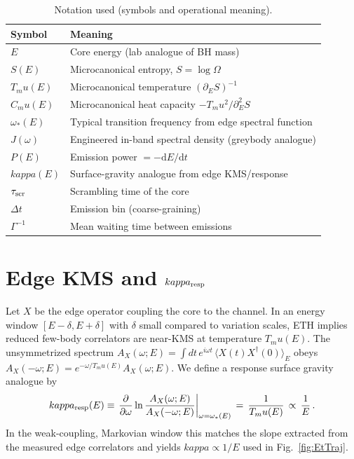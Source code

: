 \documentclass[aps,prx,onecolumn,showpacs,superscriptaddress,longbibliography,nofootinbib]{revtex4-2}
\def\kappa{kappa}%
\def\mu{mu}%
\begin{document}
\begin{table}[t]
\centering
\caption{Notation used (symbols and operational meaning).}
\label{tab:notation}
\begin{tabular}{ll}
\toprule
Symbol & Meaning \\
\midrule
$E$ & Core energy (lab analogue of BH mass) \\
$S(E)$ & Microcanonical entropy, $S=\log\Omega$ \\
$T_\mu(E)$ & Microcanonical temperature $(\partial_E S)^{-1}$ \\
$C_\mu(E)$ & Microcanonical heat capacity $-T_\mu^2/\partial_E^2 S$ \\
$\omega_\ast(E)$ & Typical transition frequency from edge spectral function \\
$J(\omega)$ & Engineered in-band spectral density (greybody analogue) \\
$P(E)$ & Emission power $= -\mathrm{d}E/\mathrm{d}t$ \\
$\kappa(E)$ & Surface-gravity analogue from edge KMS/response \\
$\tau_{\rm scr}$ & Scrambling time of the core \\
$\Delta t$ & Emission bin (coarse-graining) \\
$\Gamma^{-1}$ & Mean waiting time between emissions \\
\bottomrule
\end{tabular}
\end{table}

\appendix

\section{Edge KMS and \texorpdfstring{$\kappa_{\rm resp}$}{kapparesp}}
Let $X$ be the edge operator coupling the core to the channel. In an energy window $[E-\delta,E+\delta]$ with $\delta$ small compared to variation scales, ETH implies reduced few-body correlators are near-KMS at temperature $T_\mu(E)$. The unsymmetrized spectrum $A_X(\omega;E)=\int dt\, e^{i\omega t}\,\langle X(t)X^\dagger(0)\rangle_E$ obeys $A_X(-\omega;E)=e^{-\omega/T_\mu(E)}A_X(\omega;E)$. We define a response surface gravity analogue by
\begin{equation}
 \kappa_{\rm resp}(E) \equiv \left.\frac{\partial}{\partial \omega}\ln\frac{A_X(\omega;E)}{A_X(-\omega;E)}\right|_{\omega=\omega_\ast(E)}\,=\,\frac{1}{T_\mu(E)}\,\propto\,\frac{1}{E}\,.
\end{equation}
In the weak-coupling, Markovian window this matches the slope extracted from the measured edge correlators and yields $\kappa\propto 1/E$ used in Fig.~\ref{fig:EtTraj}.
\end{document}
